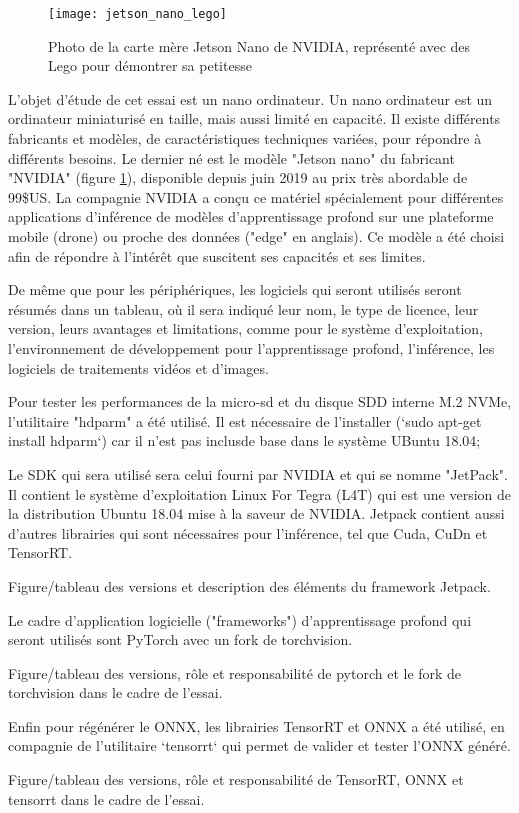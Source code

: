﻿
\begin{figure}[H]
    \centering
    \texttt{[image: jetson\_nano\_lego]}
    \caption{Photo de la carte mère Jetson Nano de NVIDIA, représenté avec des Lego pour démontrer sa petitesse}
    \label{fig:jetson_nano_lego}
\end{figure}
\par L'objet d'étude de cet essai est un nano ordinateur. Un nano ordinateur est un ordinateur miniaturisé en taille, mais aussi limité en capacité. Il existe différents fabricants et modèles, de caractéristiques techniques variées, pour répondre à différents besoins. Le dernier né est le modèle "Jetson nano" du fabricant "NVIDIA" (figure \ref{fig:jetson_nano_lego}), disponible depuis juin 2019 au prix très abordable de 99\$US. La compagnie NVIDIA a conçu ce matériel spécialement pour différentes applications d'inférence de modèles d'apprentissage profond sur une plateforme mobile (drone) ou proche des données ("edge" en anglais). Ce modèle a été choisi afin de répondre à l'intérêt que suscitent ses capacités et ses limites. 
\par De même que pour les périphériques, les logiciels qui seront utilisés seront résumés dans un tableau, où il sera indiqué leur nom, le type de licence, leur version, leurs avantages et limitations, comme pour le système d'exploitation, l'environnement de développement pour l'apprentissage profond, l'inférence, les logiciels de traitements vidéos et d'images. 
\par Pour tester les performances de la micro-sd et du disque SDD interne M.2 NVMe, l'utilitaire "hdparm" a été utilisé. Il est nécessaire de l'installer (`sudo apt-get install hdparm`) car il n'est pas inclusde base dans le système UBuntu 18.04;
\par Le SDK qui sera utilisé sera celui fourni par NVIDIA et qui se nomme "JetPack". Il contient le système d'exploitation Linux For Tegra (L4T) qui est une version de la distribution Ubuntu 18.04 mise à la saveur de NVIDIA. Jetpack contient aussi d'autres librairies qui sont nécessaires pour l'inférence, tel que Cuda, CuDn et TensorRT.
{\color{red} \par Figure/tableau des versions et description des éléments du framework Jetpack. }
\par Le cadre d'application logicielle ("frameworks") d’apprentissage profond qui seront utilisés sont PyTorch avec un fork de torchvision.
{\color{red} \par Figure/tableau des versions, rôle et responsabilité de pytorch et le fork de torchvision dans le cadre de l'essai. }
\par Enfin pour régénérer le ONNX, les librairies TensorRT et ONNX a été utilisé, en compagnie de l'utilitaire `tensorrt` qui permet de valider et tester l'ONNX généré.
{\color{red} \par Figure/tableau des versions, rôle et responsabilité de TensorRT, ONNX et tensorrt dans le cadre de l'essai. }